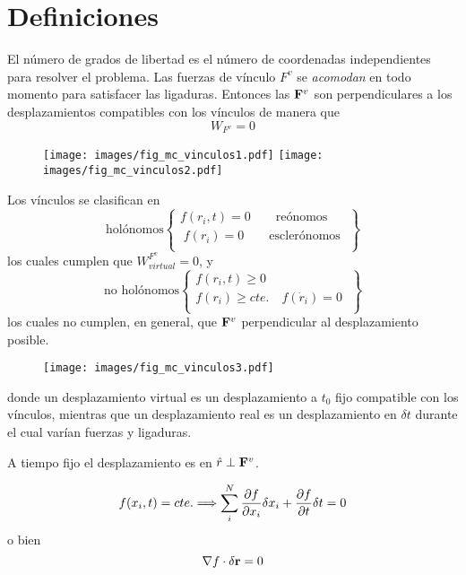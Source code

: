 \documentclass[10pt,oneside]{CBFT_book}
\begin{document}
\section{Definiciones}

El número de grados de libertad es el número de coordenadas independientes para resolver el problema.
Las fuerzas de vínculo $F^v$ se {\it acomodan} en todo momento para satisfacer las ligaduras.
Entonces las $\vb{F}^v$ son perpendiculares a los desplazamientos compatibles con los vínculos de
manera que 
\[
	W_{F^v} = 0
\]
\begin{figure}[hbt]
	\begin{center}
	\texttt{[image: images/fig\_mc\_vinculos1.pdf]}	 
	\texttt{[image: images/fig\_mc\_vinculos2.pdf]}
	\end{center}
	\caption{}
\end{figure} 

Los vínculos se clasifican en
\[
\textrm{holónomos} 
\begin{Bmatrix}
 f(r_i,t) = 0 \qquad \textrm{reónomos} \\
\; f(r_i) = 0 \qquad \textrm{esclerónomos} \;\\
\end{Bmatrix} 
\]
los cuales cumplen que  $W_{virtual}^{F^v}=0$, y
\[
\textrm{no holónomos} 
\begin{Bmatrix}
 f(r_i,t) \geq 0  \\
 f(r_i) \geq cte. \quad f(\dot{r}_i) = 0  \; \\
\end{Bmatrix}
\]
los cuales no cumplen, en general, que $\vb{F}^v$ perpendicular al desplazamiento posible.
\begin{figure}[hbt]
	\begin{center}
	\texttt{[image: images/fig\_mc\_vinculos3.pdf]}	
	\end{center}
	\caption{}
\end{figure} 
donde un desplazamiento virtual es un desplazamiento a $t_0$ fijo compatible con los vínculos,
mientras que un desplazamiento real es un desplazamiento en $\delta t$ durante el cual varían
fuerzas y ligaduras.

A tiempo fijo el desplazamiento es en $\hat{r} \perp \vb{F}^v$.

\[
	f(x_i,t) = cte. \Longrightarrow \sum_i^N \frac{\partial^{\hspace{-0.05em}} {f}}{\partial {x_i}^{\hspace{-0.05em}}} \delta x_i + \frac{\partial^{\hspace{-0.05em}} {f}}{\partial {t}^{\hspace{-0.05em}}} \delta t = 0 
\]
o bien
\[
	\nabla f \cdot \vb{\delta r} = 0
\]


\end{document}
